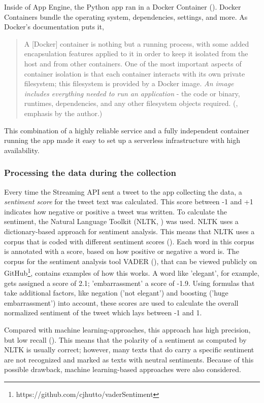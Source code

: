 Inside of App Engine, the Python app ran in a Docker Container (\cite{merkel2014docker}). Docker Containers bundle the operating system, dependencies, settings, and more. As Docker's documentation puts it,

\begin{quote}
    A [Docker] container is nothing but a running process, with some added encapsulation features applied to it in order to keep it isolated from the host and from other containers. One of the most important aspects of container isolation is that each container interacts with its own private filesystem; this filesystem is provided by a Docker image. \emph{An image includes everything needed to run an application} - the code or binary, runtimes, dependencies, and any other filesystem objects required. (\cite{dockerOrientationSetup2020}, emphasis by the author.)
\end{quote}

This combination of a highly reliable service and a fully independent container running the app made it easy to set up a serverless infrastructure with high availability.

\subsubsection{Processing the data during the collection}
Every time the Streaming API sent a tweet to the app collecting the data, a \emph{sentiment score} for the tweet text was calculated. This score between -1 and +1 indicates how negative or positive a tweet was written. To calculate the sentiment, the Natural Language Toolkit (NLTK, \cite{loper2002nltk}) was used. NLTK uses a dictionary-based approach for sentiment analysis. This means that NLTK uses a corpus that is coded with different sentiment scores (\cite{haselmayer2017sentiment}). Each word in this corpus is annotated with a score, based on how positive or negative a word is. The corpus for the sentiment analysis tool VADER (\cite{gilbert2014vader}), that can be viewed publicly on GitHub\footnote{https://github.com/cjhutto/vaderSentiment}, contains examples of how this works. A word like 'elegant', for example, gets assigned a score of 2.1; 'embarrassment' a score of -1.9. Using formulas that take additional factors, like negation ('not elegant') and boosting ('huge embarrassment') into account, these scores are used to calculate the overall normalized sentiment of the tweet which lays between -1 and 1.

Compared with machine learning-approaches, this approach has high precision, but low recall (\cite{sorokaBadNewsMad2015}). This means that the polarity of a sentiment as computed by NLTK is usually correct; however, many texts that do carry a specific sentiment are not recognized and marked as texts with neutral sentiments. Because of this possible drawback, machine learning-based approaches were also considered.

